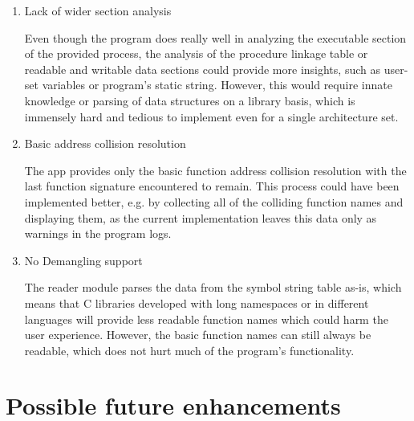 \begin{enumerate}

    \item {Lack of wider section analysis}
    
    Even though the program does really well in analyzing the executable section of the provided process, the analysis of the procedure linkage table or readable and writable data sections could provide more insights, such as user-set variables or program's static string.
    However, this would require innate knowledge or parsing of data structures on a library basis, which is immensely hard and tedious to implement even for a single architecture set.
    
    \item{Basic address collision resolution}

    The app provides only the basic function address collision resolution with the last function signature encountered to remain.
    This process could have been implemented better, e.g. by collecting all of the colliding function names and displaying them, as the current implementation leaves this data only as warnings in the program logs. 

    \item{No Demangling support}

    The reader module parses the data from the symbol string table as-is, which means that C libraries developed with long namespaces or in different languages will provide less readable function names which could harm the user experience.
    However, the basic function names can still always be readable, which does not hurt much of the program's functionality. 
    
\end{enumerate}

\section{Possible future enhancements}


